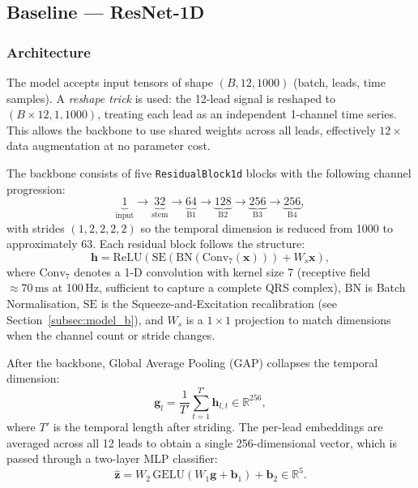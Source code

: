 \subsection{Baseline --- ResNet-1D}
\label{subsec:model_a}

\subsubsection{Architecture}

The model accepts input tensors of shape $(B, 12, 1000)$ (batch,
leads, time samples).
A \emph{reshape trick} is used: the 12-lead signal is reshaped to
$(B \times 12, 1, 1000)$, treating each lead as an independent
1-channel time series.
This allows the backbone to use shared weights across all leads,
effectively $12\times$ data augmentation at no parameter cost.

The backbone consists of five \texttt{ResidualBlock1d} blocks with the
following channel progression:
\begin{equation}
  \underbrace{1}_{\text{input}} \to
  \underbrace{32}_{\text{stem}} \to
  \underbrace{64}_{\text{B1}} \to
  \underbrace{128}_{\text{B2}} \to
  \underbrace{256}_{\text{B3}} \to
  \underbrace{256}_{\text{B4}},
  \label{eq:cnn_channels}
\end{equation}
with strides $(1, 2, 2, 2, 2)$ so the temporal dimension is reduced
from 1000 to approximately 63.
Each residual block follows the structure:
\begin{equation}
  \mathbf{h} = \mathrm{ReLU}\!\left(
    \mathrm{SE}\!\left(
      \mathrm{BN}(\mathrm{Conv}_7(\mathbf{x}))
    \right) + W_s\mathbf{x}
  \right),
  \label{eq:resblock}
\end{equation}
where $\mathrm{Conv}_7$ denotes a 1-D convolution with kernel size 7
(receptive field $\approx 70\,\text{ms}$ at 100\,Hz, sufficient to
capture a complete QRS complex), $\mathrm{BN}$ is Batch Normalisation,
$\mathrm{SE}$ is the Squeeze-and-Excitation recalibration (see
Section~\ref{subsec:model_b}), and $W_s$ is a $1\times 1$ projection
to match dimensions when the channel count or stride changes.

After the backbone, Global Average Pooling (GAP) collapses the temporal
dimension:
\begin{equation}
  \mathbf{g}_l = \frac{1}{T'}\sum_{t=1}^{T'} \mathbf{h}_{l,t}
  \in \mathbb{R}^{256},
  \label{eq:gap}
\end{equation}
where $T'$ is the temporal length after striding.
The per-lead embeddings are averaged across all 12 leads to obtain a
single 256-dimensional vector, which is passed through a two-layer MLP
classifier:
\begin{equation}
  \hat{\mathbf{z}} = W_2\, \mathrm{GELU}(W_1 \mathbf{g} + \mathbf{b}_1) + \mathbf{b}_2
  \in \mathbb{R}^5.
  \label{eq:mlp}
\end{equation}

